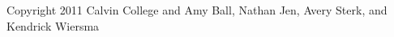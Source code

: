\documentclass[11pt,letterpaper,titlepage]{article}
\begin{document}
\begin{titlepage}
\begin{center}
\vspace{0.25in}

{\Large Copyright 2011 Calvin College and Amy Ball, Nathan Jen, Avery Sterk, and Kendrick Wiersma}
\vspace{1in}


\end{center}
\end{titlepage}
\begin{abstract}

\end{abstract}
\newpage
\pagestyle{plain}
\tableofcontents
\newpage
\listoffigures
\listoftables
\lstlistoflistings

\newpage
\protect\pagestyle{mySuperFancy}
\begin{spacing}{1.5}
\setcounter{page}{1}
















\appendix







\end{spacing}
\end{document}
